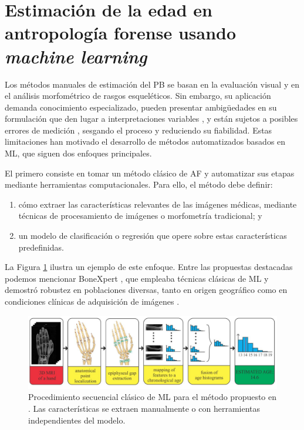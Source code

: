 
\section{Estimación de la edad en antropología forense usando \textit{machine learning}}


Los métodos manuales de estimación del PB se basan en la evaluación visual y en el análisis morfométrico de rasgos esqueléticos. Sin embargo, su aplicación demanda conocimiento especializado, pueden presentar ambigüedades en su formulación que den lugar a interpretaciones variables \cite{berst2001}, y están sujetos a posibles errores de medición \cite{langley2018}, sesgando el proceso y reduciendo su fiabilidad. Estas limitaciones han motivado el desarrollo de métodos automatizados basados en ML, que siguen dos enfoques principales. 

El primero consiste en tomar un método clásico de AF y automatizar sus etapas mediante herramientas computacionales. Para ello, el método debe definir:

\begin{enumerate}
    
    \item cómo extraer las características relevantes de las imágenes médicas, mediante técnicas de procesamiento de imágenes o morfometría tradicional; y

    \item un modelo de clasificación o regresión que opere sobre estas características predefinidas.

\end{enumerate}

La Figura \ref{fig:MRI_pipeline} ilustra un ejemplo de este enfoque. Entre las propuestas destacadas podemos mencionar BoneXpert \cite{thodberg2008}, que empleaba técnicas clásicas de ML y demostró robustez en poblaciones diversas, tanto en origen geográfico como en condiciones clínicas de adquisición de imágenes \cite{van2009, martin2010, thodberg2010}. 

\begin{figure}[h]
    \centering
    \includegraphics[width=\textwidth]{capitulos/cap_01/imagenes/MRI_pipeline.png}
    \caption[
        Procedimiento secuencial clásico de ML para el método propuesto en \cite{stern2014}.
    ]{
        Procedimiento secuencial clásico de ML para el método propuesto en \cite{stern2014}. 
        Las características se extraen manualmente o con herramientas independientes del modelo.
    }
    \label{fig:MRI_pipeline}
\end{figure}

